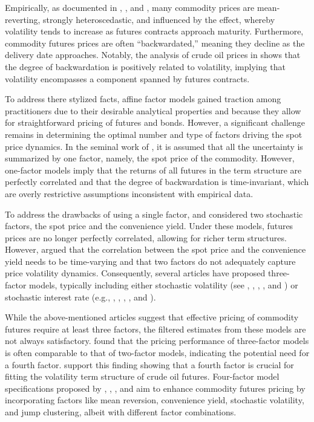 \documentclass{article}
\begin{document}
Empirically, as documented in \cite{litzenberger95}, \cite{duffie99}, and \cite{eydeland03}, many commodity prices are mean-reverting, strongly heteroscedastic, and influenced by the \cite{samuelson65} effect, whereby volatility tends to increase as futures contracts approach maturity. Furthermore, commodity futures prices are often ``backwardated,'' meaning they decline as the delivery date approaches. Notably, the analysis of crude oil prices in \cite{routledge00} shows that the degree of backwardation is positively related to volatility, implying that volatility encompasses a component spanned by futures contracts.

To address there stylized facts, affine factor models gained traction among practitioners due to their desirable analytical properties and because they allow for straightforward pricing of futures and bonds. However, a significant challenge remains in determining the optimal number and type of factors driving the spot price dynamics. In the seminal work of \cite{schwartz97}, it is assumed that all the uncertainty is summarized by one factor, namely, the spot price of the commodity. However, one-factor models imply that the returns of all futures in the term structure are perfectly correlated and that the degree of backwardation is time-invariant, which are overly restrictive assumptions inconsistent with empirical data.

To address the drawbacks of using a single factor, \cite{schwartz90} and \cite{schwartz97} considered two stochastic factors, the spot price and the convenience yield. Under these models, futures prices are no longer perfectly correlated, allowing for richer term structures. However, \cite{routledge00} argued that the correlation between the spot price and the convenience yield needs to be time-varying and that two factors do not adequately capture price volatility dynamics. Consequently, several articles have proposed three-factor models, typically including either stochastic volatility (see \cite{deng00}, \cite{geman05}, \cite{hikspoors08}, \cite{lutz10}, and \cite{hughen10}) or stochastic interest rate (e.g., \cite{cortazar94}, \cite{schwartz97}, \cite{cortazar03}, \cite{casassus05}, \cite{tang12} and \cite{mellios16}).

While the above-mentioned articles suggest that effective pricing of commodity futures require at least three factors, the filtered estimates from these models are not always satisfactory. \cite{hughen10} found that the pricing performance of three-factor models is often comparable to that of two-factor models, indicating the potential need for a fourth factor. \cite{cortazar06} support this finding showing that a fourth factor is crucial for fitting the volatility term structure of crude oil futures. Four-factor model specifications proposed by \cite{yan02}, \cite{schwartz09a}, \cite{schwartz09b}, and \cite{spinler17} aim to enhance commodity futures pricing by incorporating factors like mean reversion, convenience yield, stochastic volatility, and jump clustering, albeit with different factor combinations.
 
\end{document}
